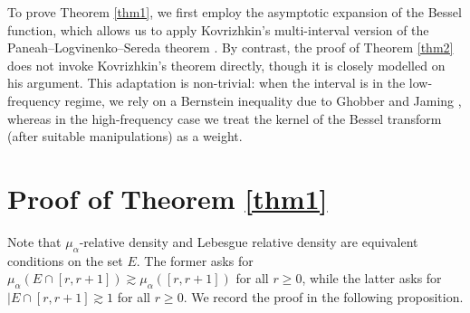 \documentclass[11pt,a4paper,reqno,dvipsnames]{amsart}
\renewcommand{\ge}{\geqslant}
\numberwithin{equation}{section}
\theoremstyle{plain}
\theoremstyle{definition}
\theoremstyle{remark}
\begin{document}
 To prove Theorem \ref{thm1}, we first employ the asymptotic expansion of the Bessel function, which allows us to apply Kovrizhkin’s multi-interval version of the Paneah–Logvinenko–Sereda theorem \cite{k1}. By contrast, the proof of Theorem \ref{thm2} does not invoke Kovrizhkin’s theorem directly, though it is closely modelled on his argument. This adaptation is non-trivial: when the interval is in the low-frequency regime, we rely on a Bernstein inequality due to Ghobber and Jaming \cite{gj}, whereas in the high-frequency case we treat the kernel of the Bessel transform (after suitable manipulations) as a weight.

\section{Proof of Theorem \ref{thm1}}

Note that $\mu_\alpha$-relative density and Lebesgue relative density are equivalent conditions on the set $E$. The former asks for $\mu_\alpha(E\cap [r,r+1]) \gtrsim \mu_\alpha([r,r+1])$ for all $r \ge 0$, while the latter asks for $|E \cap [r,r+1] \gtrsim 1$ for all $r \ge 0$. We record the proof in the following proposition.
\end{document}

